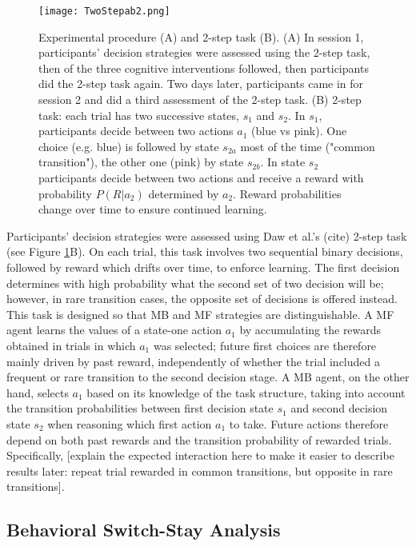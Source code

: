 \documentclass[11pt]{article} %
\begin{document}
\begin{figure}
	\texttt{[image: TwoStepab2.png]}
	\caption{Experimental procedure (A) and 2-step task (B). (A) In session 1, participants' decision strategies were assessed using the 2-step task, then of the three cognitive interventions followed, then participants did the 2-step task again. Two days later, participants came in for session 2 and did a third assessment of the 2-step task. (B) 2-step task: each trial has two successive states, $s_{1}$ and $s_{2}$. In $s_{1}$, participants decide between two actions $a_{1}$ (blue vs pink). One choice (e.g. blue) is followed by state $s_{2a}$ most of the time ("common transition"), the other one (pink) by state $s_{2b}$. In state $s_{2}$ participants decide between two actions and receive a reward with probability $P(R|a_{2})$ determined by $a_{2}$. Reward probabilities change over time to ensure continued learning.}
	\label{TwoStep}
\end{figure}

Participants' decision strategies were assessed using Daw et al.'s (cite) 2-step task (see Figure \ref{TwoStep}B). On each trial, this task involves two sequential binary decisions, followed by reward which drifts over time, to enforce learning. The first decision determines with high probability what the second set of two decision will be; however, in rare transition cases, the opposite set of decisions is offered instead. This task is designed so that MB and MF strategies are distinguishable. A MF agent learns the values of a state-one action $a_{1}$ by accumulating the rewards obtained in trials in which $a_{1}$ was selected; future first choices are therefore mainly driven by past reward, independently of whether the trial included a frequent or rare transition to the second decision stage. A MB agent, on the other hand, selects $a_{1}$ based on its knowledge of the task structure, taking into account the transition probabilities between first decision state $s_{1}$ and second decision state $s_{2}$ when reasoning which first action $a_{1}$ to take. Future actions therefore depend on both past rewards and the transition probability of rewarded trials. Specifically, [explain the expected interaction here to make it easier to describe results later: repeat trial rewarded in common transitions, but opposite in rare transitions].

\subsection{Behavioral Switch-Stay Analysis}
\end{document}
